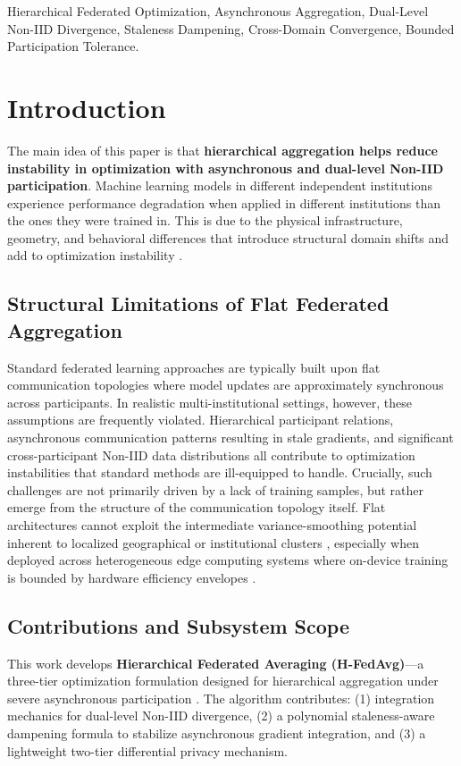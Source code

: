 \documentclass[conference]{IEEEtran}
\begin{document}
\begin{IEEEkeywords}
Hierarchical Federated Optimization, Asynchronous Aggregation, Dual-Level Non-IID Divergence, Staleness Dampening, Cross-Domain Convergence, Bounded Participation Tolerance.
\end{IEEEkeywords}

\section{Introduction}

The main idea of this paper is that \textbf{hierarchical aggregation helps reduce instability in optimization with asynchronous and dual-level Non-IID participation}. Machine learning models in different independent institutions experience performance degradation when applied in different institutions than the ones they were trained in. This is due to the physical infrastructure, geometry, and behavioral differences that introduce structural domain shifts and add to optimization instability \cite{b13}.

\subsection{Structural Limitations of Flat Federated Aggregation}
Standard federated learning approaches are typically built upon flat communication topologies where model updates are approximately synchronous across participants. In realistic multi-institutional settings, however, these assumptions are frequently violated. Hierarchical participant relations, asynchronous communication patterns resulting in stale gradients, and significant cross-participant Non-IID data distributions all contribute to optimization instabilities that standard methods are ill-equipped to handle. Crucially, such challenges are not primarily driven by a lack of training samples, but rather emerge from the structure of the communication topology itself. Flat architectures cannot exploit the intermediate variance-smoothing potential inherent to localized geographical or institutional clusters \cite{b1, b5, b6}, especially when deployed across heterogeneous edge computing systems \cite{b2, b3} where on-device training is bounded by hardware efficiency envelopes \cite{b10}.

\subsection{Contributions and Subsystem Scope}
This work develops \textbf{Hierarchical Federated Averaging (H-FedAvg)}---a three-tier optimization formulation designed for hierarchical aggregation under severe asynchronous participation \cite{b30}. The algorithm contributes: (1) integration mechanics for dual-level Non-IID divergence, (2) a polynomial staleness-aware dampening formula to stabilize asynchronous gradient integration, and (3) a lightweight two-tier differential privacy mechanism.
\end{document}
